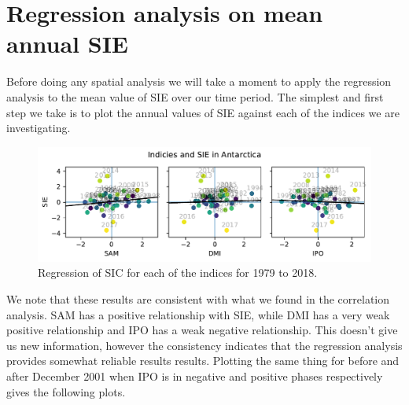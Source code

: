 \section{Regression analysis on mean annual SIE}

Before doing any spatial analysis we will take a moment to apply the regression analysis to the mean value of SIE over our time period. The simplest and first step we take is to plot the annual values of SIE against each of the indices we are investigating.
\begin{figure}[H]
    \centering
    \includegraphics[width=\linewidth]{Images_3.0/regressions/scatter_anomalous_n1_annually_detrended_1979_2018.pdf}
    \caption{Regression of SIC for each of the indices for 1979 to 2018.}
    \label{fig:scatter_anomalous_n1_annually_1979_2018}
\end{figure}
We note that these results are consistent with what we found in the correlation analysis. SAM has a positive relationship with SIE, while DMI has a very weak positive relationship and IPO has a weak negative relationship. This doesn't give us new information, however the consistency indicates that the regression analysis provides somewhat reliable results results. Plotting the same thing for before and after December 2001 when IPO is in negative and positive phases respectively gives the following plots.

